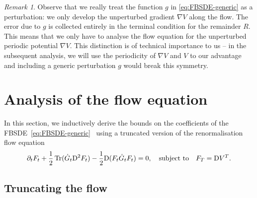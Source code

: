 \documentclass[11pt, a4paper]{scrartcl}
\numberwithin{equation}{section}
\theoremstyle{plain}
\theoremstyle{remark}
\newtheorem{remark}[foo]{Remark}
\newcommand{\mathD}{\mathrm{D}}
\newcommand{\tmop}[1]{\ensuremath{\operatorname{#1}}}
\begin{document}
\begin{remark}
  Observe that we really treat the function $g$ in \eqref{eq:FBSDE-generic} as
  a perturbation: we only develop the unperturbed gradient $\nabla V$ along
  the flow. The error due to $g$ is collected entirely in the terminal
  condition for the remainder $R$. This means that we only have to analyse the
  flow equation for the unperturbed periodic potential $\nabla V$.
  This distinction is of technical importance to us -- in the subsequent analysis, we will use the periodicity of $\nabla V$ and $V$ to our advantage 
  and including a generic perturbation $g$ would break this symmetry.
\end{remark}

\section{Analysis of the flow equation}\label{sec:flow-eq}

In this section, we inductively derive the bounds on the coefficients of the
FBSDE~\eqref{eq:FBSDE-generic} \ using a truncated version of the
renormalisation flow equation
\begin{equation}
  \partial_t F_t + \frac{1}{2} \tmop{Tr} (\dot{G}_t \mathD^2 F_t) -
  \frac{1}{2} \mathD (F_t  \dot{G}_t F_t) = 0 \label{eq:F-flow}, \quad
  \text{subject to\quad} F_T = \mathD V^T .
\end{equation}
\subsection{Truncating the
flow}\label{rem:relevant-terms-b-leq-4}\label{sec:truncated-flow}
\end{document}
